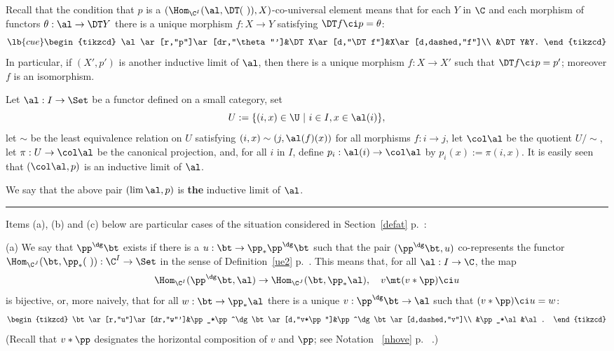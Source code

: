 \documentclass[12pt]{article}
\theoremstyle{remark}
\theoremstyle{definition}
\begin{document}
Recall that the condition that $p$ is a $(\Hom_{\C^I}(\al,\DT(\ )),X)$\--co-universal element means that for each $Y$ in $\C$ and each morphism of functors $\theta:\al\to\DT Y$ there is a unique morphism $f:X\to Y$ satisfying $\DT f\ci p=\theta$: 
\begin{equation}\lb{cue}
\begin{tikzcd}
\al\ar[r,"p"]\ar[dr,"\theta"']&\DT X\ar[d,"\DT f"]&X\ar[d,dashed,"f"]\\ 
&\DT Y&Y.
\end{tikzcd}
\end{equation} 
In particular, if $(X',p')$ is another inductive limit of $\al$, then there is a unique morphism $f:X\to X'$ such that $\DT f\ci p=p'$; moreover $f$ is an isomorphism.

Let $\al:I\to\Set$ be a functor defined on a small category, set 
$$ 
U:=\{(i,x)\in\U\ |\ i\in I,x\in\al(i)\},
$$ 
let $\sim$ be the least equivalence relation on $U$ satisfying $(i,x)\sim(j,\al(f)(x))$ for all morphisms $f:i\to j$, let $\col\al$ be the quotient $U/\!\!\sim$, let $\pi:U\to\col\al$ be the canonical projection, and, for all $i$ in $I$, define $p_i:\al(i)\to\col\al$ by $p_i(x):=\pi(i,x)$. It is easily seen that $(\col\al,p)$ is an inductive limit of $\al$. 
\begin{conv}
We say that the above pair $(\lim\al,p)$ is \textbf{the} inductive limit of $\al$.
\end{conv}

\hrule

Items (a), (b) and (c) below are particular cases of the situation considered in Section~\ref{defat} p.~:%

\nn(a) We say that $\pp^\dg\bt$ exists if there is a $u:\bt\to\pp_*\pp^\dg\bt$ such that the pair $(\pp^\dg\bt,u)$ co-represents the functor $\Hom_{\C^J}(\bt,\pp_*(\ )):\C^I\to\Set$ in the sense of Definition~\ref{ue2} p.~. This means that, for all $\al:I\to\C$, the map 
$$
\Hom_{\C^I}(\pp^\dg\bt,\al)\to\Hom_{\C^J}(\bt,\pp_*\al),\quad v\mt(v*\pp)\ci u
$$ 
is bijective, or, more naively, that for all $w:\bt\to\pp_*\al$ there is a unique $v:\pp^\dg\bt\to\al$ such that $(v*\pp)\ci u=w$: 
$$
\begin{tikzcd}
\bt\ar[r,"u"]\ar[dr,"w"']&\pp_*\pp^\dg\bt\ar[d,"v*\pp"]&\pp^\dg\bt\ar[d,dashed,"v"]\\ 
&\pp_*\al&\al.
\end{tikzcd}
$$
(Recall that $v*\pp$ designates the horizontal composition of $v$ and $\pp$; see Notation~ \ref{nhove} p.~ .)%
\end{document}
